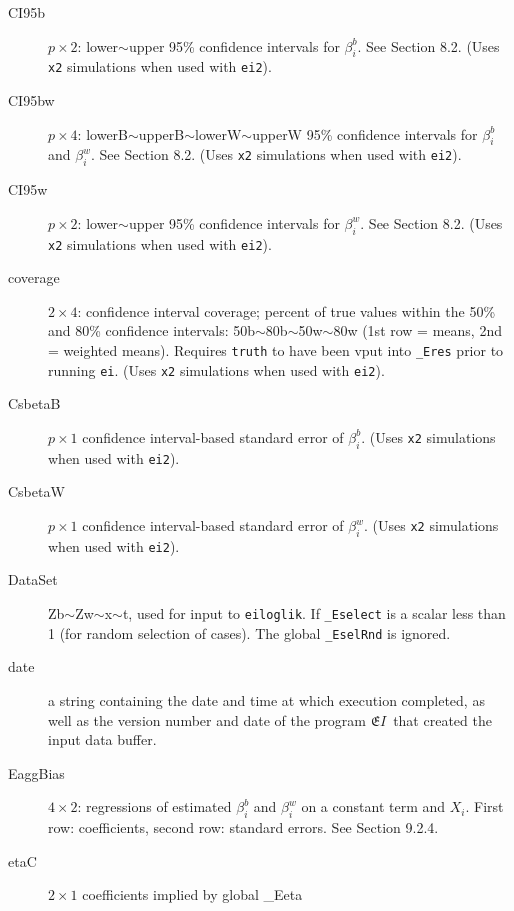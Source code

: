 \documentclass[11pt,titlepage]{article}
\newcommand{\EI}{\ensuremath{{\mathfrak EI}}}
\begin{document}
\begin{description}
\item[CI95b] $p\times 2$: lower$\sim$upper 95\% confidence intervals
  for $\beta_i^b$.  See Section 8.2.  (Uses \texttt{x2}
  simulations when used with \texttt{ei2}).

\item[CI95bw] $p\times 4$: lowerB$\sim$upperB$\sim$lowerW$\sim$upperW
  95\% confidence intervals for $\beta_i^b$ and $\beta_i^w$.  See
  Section 8.2.  (Uses \texttt{x2} simulations when used
  with \texttt{ei2}).

\item[CI95w] $p\times 2$: lower$\sim$upper 95\% confidence intervals
  for $\beta_i^w$.  See Section 8.2.  (Uses \texttt{x2}
  simulations when used with \texttt{ei2}).

\item[coverage] $2\times 4$: confidence interval coverage; percent of
  true values within the 50\% and 80\% confidence intervals:
  50b$\sim$80b$\sim$50w$\sim$80w (1st row = means, 2nd = weighted
  means).  Requires \texttt{truth} to have been vput into
  \texttt{\_Eres} prior to running \texttt{ei}.  (Uses \texttt{x2}
  simulations when used with \texttt{ei2}).

\item[CsbetaB] $p\times 1$ confidence interval-based standard error of
  $\beta_i^b$.  (Uses \texttt{x2} simulations when used with
  \texttt{ei2}).

\item[CsbetaW] $p\times 1$ confidence interval-based standard error of
  $\beta_i^w$.  (Uses \texttt{x2} simulations when used with
  \texttt{ei2}).

\item[DataSet] Zb$\sim$Zw$\sim$x$\sim$t, used for input to
  \texttt{eiloglik}.  If \texttt{\_Eselect} is a scalar less than 1
  (for random selection of cases).  The global \texttt{\_EselRnd} is
  ignored.

\item[date] a string containing the date and time at which execution
  completed, as well as the version number and date of the program
  \EI\ that created the input data buffer.

\item[EaggBias] $4\times 2$: regressions of estimated $\beta_i^b$ and
  $\beta_i^w$ on a constant term and $X_i$.  First row: coefficients,
  second row: standard errors.  See Section 9.2.4.

\item[etaC] $2\times 1$ coefficients implied by global \_Eeta


\end{description}
\end{document}
